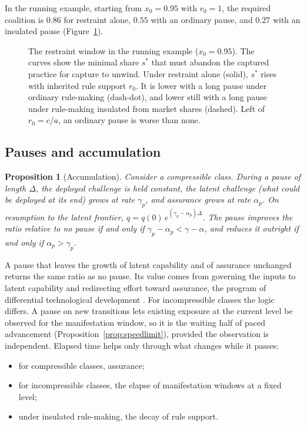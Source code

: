 \documentclass[11pt]{article}
\theoremstyle{plain}
\newtheorem{proposition}{Proposition}
\theoremstyle{definition}
\begin{document}
In the running example, starting from $x_0=0.95$ with $r_0=1$, the required coalition is $0.86$ for restraint alone, $0.55$ with an ordinary pause, and $0.27$ with an insulated pause (Figure~\ref{fig:coalition}).

\begin{figure}[t]
\centering

\caption{The restraint window in the running example ($x_0=0.95$). The curves show the minimal share $s^\ast$ that must abandon the captured practice for capture to unwind. Under restraint alone (solid), $s^\ast$ rises with inherited rule support $r_0$. It is lower with a long pause under ordinary rule-making (dash-dot), and lower still with a long pause under rule-making insulated from market shares (dashed). Left of $r_0=c/a$, an ordinary pause is worse than none.}
\label{fig:coalition}
\end{figure}

\subsection{Pauses and accumulation}

\begin{proposition}[Accumulation]\label{prop:accumulation}
Consider a compressible class. During a pause of length $\Delta$, the deployed challenge is held constant, the latent challenge (what could be deployed at its end) grows at rate $\gamma_p$, and assurance grows at rate $\alpha_p$. On resumption to the latent frontier, $q=q(0)\,e^{(\gamma_p-\alpha_p)\Delta}$. The pause improves the ratio relative to no pause if and only if $\gamma_p-\alpha_p<\gamma-\alpha$, and reduces it outright if and only if $\alpha_p>\gamma_p$.
\end{proposition}

A pause that leaves the growth of latent capability and of assurance unchanged returns the same ratio as no pause. Its value comes from governing the inputs to latent capability and redirecting effort toward assurance, the program of differential technological development \citep{bostrom2002}. For incompressible classes the logic differs. A pause on new transitions lets existing exposure at the current level be observed for the manifestation window, so it is the waiting half of paced advancement (Proposition~\ref{prop:speedlimit}), provided the observation is independent. Elapsed time helps only through what changes while it passes:
\begin{itemize}[leftmargin=*]
\item for compressible classes, assurance;
\item for incompressible classes, the elapse of manifestation windows at a fixed level;
\item under insulated rule-making, the decay of rule support.
\end{itemize}
\end{document}
